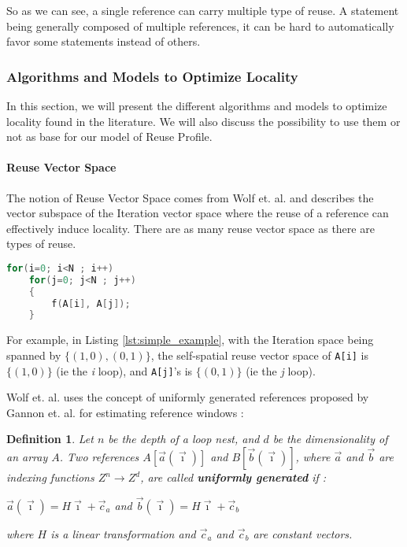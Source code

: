 \documentclass[paper=a4, fontsize=11.5pt]{scrartcl}
\newtheorem{defn}{Definition}[section]
\numberwithin{equation}{section}        %
\numberwithin{figure}{section}          %
\numberwithin{table}{section}               %
\begin{document}
                So as we can see, a single reference can carry multiple type of reuse.
                A statement being generally composed of multiple references, it 
                can be hard to automatically favor some statements instead of others.
        \subsubsection{Algorithms and Models to Optimize Locality}
        In this section, we will present the different algorithms and models to optimize
        locality found in the literature. We will also discuss the possibility to use
        them or not as base for our model of Reuse Profile.
        
        \paragraph{Reuse Vector Space}
        \label{sec:wolf_91}
            The notion of Reuse Vector Space comes from Wolf et. al.\cite{Wolf'91} and describes
            the vector subspace of the Iteration vector space where the reuse of
            a reference can effectively induce locality.
            There are as many reuse vector space as there are types of reuse.

\begin{lstlisting}[frame=single, language=C, caption=Simple Example, label={lst:simple_example}]
for(i=0; i<N ; i++)
    for(j=0; j<N ; j++)
    {
        f(A[i], A[j]);
    }
\end{lstlisting}

            For example, in Listing \ref{lst:simple_example}, with the Iteration
            space being spanned by $\{(1,0),(0,1)\}$, the self-spatial reuse vector space of
            \verb'A[i]' is $\{(1,0)\}$ (ie the {\it i} loop), and \verb'A[j]''s is $\{(0,1)\}$
            (ie the {\it j} loop).

            Wolf et. al. uses the concept of uniformly generated references proposed
            by Gannon et. al.\cite{Gannon:1988:SCL:50454.50460} for estimating reference
            windows :
            \begin{defn}
            \label{sec:uniformly_generated}
                Let $n$ be the depth of a loop nest, and $d$ be the dimensionality of
                an array $A$. Two references $A[\vec{a}(\vec{\imath})]$ and
                $B[\vec{b}(\vec{\imath})]$, where $\vec{a}$ and $\vec{b}$ are indexing
                functions $Z^{n} \rightarrow Z^{d}$, are called \textbf{uniformly generated} if :
                \begin{center}
                    $\vec{a}(\vec{\imath}) = H\vec{\imath}+\vec{c}_a$ and $\vec{b}(\vec{\imath}) = H\vec{\imath}+\vec{c}_b$
                \end{center}
                where $H$ is a linear transformation and $\vec{c}_a$ and $\vec{c}_b$ are constant vectors.
            \end{defn}
            
\end{document}
